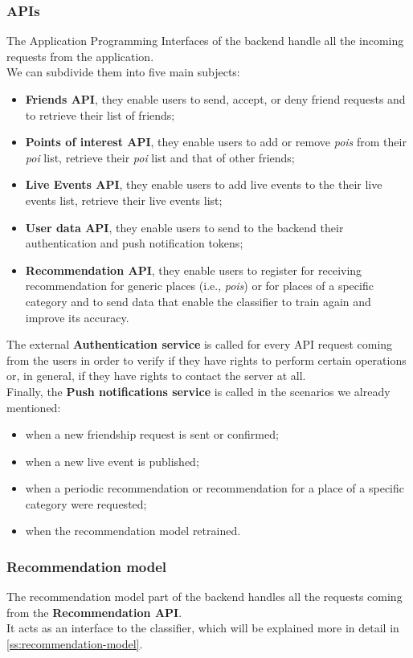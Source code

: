 \documentclass[../../main]{subfiles}
\begin{document}
\subsubsection{APIs}
The Application Programming Interfaces of the backend handle all the incoming requests from the application.\\
We can subdivide them into five main subjects:
\begin{itemize}
    \item \textbf{Friends API}, they enable users to send, accept, or deny friend requests and to retrieve their list of friends;
    \item \textbf{Points of interest API}, they enable users to add or remove \textit{pois} from their \textit{poi} list, retrieve their \textit{poi} list and that of other friends;
    \item \textbf{Live Events API}, they enable users to add live events to the their live events list, retrieve their live events list;
    \item \textbf{User data API}, they enable users to send to the backend their authentication and push notification tokens;
    \item \textbf{Recommendation API}, they enable users to register for receiving recommendation for generic places (i.e., \textit{pois}) or for places of a specific category and to send data that enable the classifier to train again and improve its accuracy.
\end{itemize}
The external \textbf{Authentication service} is called for every API request coming from the users in order to verify if they have rights to perform certain operations or, in general, if they have rights to contact the server at all.\\
Finally, the \textbf{Push notifications service} is called in the scenarios we already mentioned:
\begin{itemize}
    \item when a new friendship request is sent or confirmed;
    \item when a new live event is published;
    \item when a periodic recommendation or recommendation for a place of a specific category were requested;
    \item when the recommendation model retrained.
\end{itemize}

\label{sss:recommendation-model-design}
\subsubsection{Recommendation model}
The recommendation model part of the backend handles all the requests coming from the \textbf{Recommendation API}.\\
It acts as an interface to the classifier, which will be explained more in detail in \ref{ss:recommendation-model}.
\end{document}

